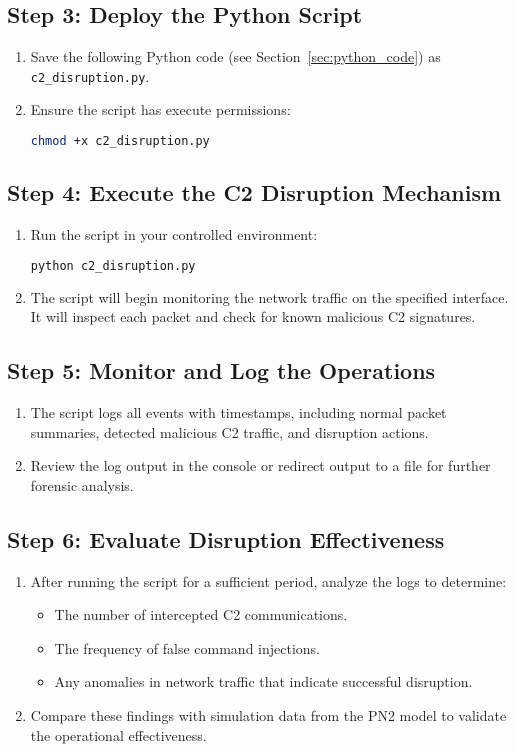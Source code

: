 \documentclass{article}
\begin{document}
\subsection{Step 3: Deploy the Python Script}
\begin{enumerate}
    \item Save the following Python code (see Section~\ref{sec:python_code}) as \texttt{c2\_disruption.py}.
    \item Ensure the script has execute permissions:
    \begin{lstlisting}[language=bash]
chmod +x c2_disruption.py
    \end{lstlisting}
\end{enumerate}

\subsection{Step 4: Execute the C2 Disruption Mechanism}
\begin{enumerate}
    \item Run the script in your controlled environment:
    \begin{lstlisting}[language=bash]
python c2_disruption.py
    \end{lstlisting}
    \item The script will begin monitoring the network traffic on the specified interface. It will inspect each packet and check for known malicious C2 signatures.
\end{enumerate}

\subsection{Step 5: Monitor and Log the Operations}
\begin{enumerate}
    \item The script logs all events with timestamps, including normal packet summaries, detected malicious C2 traffic, and disruption actions.
    \item Review the log output in the console or redirect output to a file for further forensic analysis.
\end{enumerate}

\subsection{Step 6: Evaluate Disruption Effectiveness}
\begin{enumerate}
    \item After running the script for a sufficient period, analyze the logs to determine:
    \begin{itemize}
        \item The number of intercepted C2 communications.
        \item The frequency of false command injections.
        \item Any anomalies in network traffic that indicate successful disruption.
    \end{itemize}
    \item Compare these findings with simulation data from the PN2 model to validate the operational effectiveness.
\end{enumerate}
\end{document}
